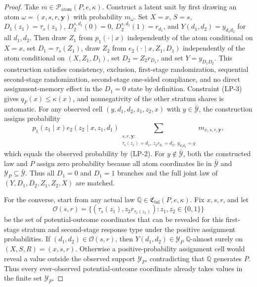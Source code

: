 \documentclass[11pt]{article}
\theoremstyle{definition}
\theoremstyle{plain}
\theoremstyle{remark}
\begin{document}
\begin{proof}
Take \(m\in\mathcal P_{\mathrm{atom}}(P,e,\kappa)\).
Construct a latent unit by first drawing an atom \(\omega=(x,s,r,\mathbf y)\) with probability \(m_\omega\).
Set \(X=x\), \(S=s\), \(D_1(z_1)=\tau_s(z_1)\), \(D_2^{s,d_1}(0)=0\), \(D_2^{s,d_1}(1)=r_{d_1}\), and \(Y(d_1,d_2)=y_{d_1d_2}\) for all \(d_1,d_2\).
Then draw \(Z_1\) from \(p_1(\cdot\mid x)\) independently of the atom conditional on \(X=x\), set \(D_1=\tau_s(Z_1)\), draw \(Z_2\) from \(e_2(\cdot\mid x,Z_1,D_1)\) independently of the atom conditional on \((X,Z_1,D_1)\), set \(D_2=Z_2r_{D_1}\), and set \(Y=y_{D_1D_2}\).
This construction satisfies consistency, exclusion, first-stage randomization, sequential second-stage randomization, second-stage one-sided compliance, and no direct assignment-memory effect in the \(D_1=0\) state by definition.
Constraint (LP-3) gives \(q_F(x)\le\kappa(x)\), and nonnegativity of the other stratum shares is automatic.
For any observed cell \((y,d_1,d_2,z_1,z_2,x)\) with \(y\in\bar{\mathcal Y}\), the construction assigns probability
\[
p_1(z_1\mid x)e_2(z_2\mid x,z_1,d_1)
\sum_{\substack{s,r,\mathbf y:\\
\tau_s(z_1)=d_1,\ z_2r_{d_1}=d_2,\ y_{d_1d_2}=y}}
m_{x,s,r,\mathbf y},
\]
which equals the observed probability by (LP-2).
For \(y\notin\bar{\mathcal Y}\), both the constructed law and \(P\) assign zero probability because all atom coordinates lie in \(\bar{\mathcal Y}\) and \(\mathcal Y_P\subseteq\bar{\mathcal Y}\).
Thus all \(D_1=0\) and \(D_1=1\) branches and the full joint law of \((Y,D_1,D_2,Z_1,Z_2,X)\) are matched.

For the converse, start from any actual law \(\mathbb Q\in\mathfrak C_{\mathrm{bd}}(P,e,\kappa)\).
Fix \(x,s,r\), and let
\[
\mathcal O(s,r)=
\{(\tau_s(z_1),z_2r_{\tau_s(z_1)}): z_1,z_2\in\{0,1\}
\}
\]
be the set of potential-outcome coordinates that can be revealed for this first-stage stratum and second-stage response type under the positive assignment probabilities.
If \((d_1,d_2)\in\mathcal O(s,r)\), then \(Y(d_1,d_2)\in\mathcal Y_P\) \(\mathbb Q\)-almost surely on \((X,S,R)=(x,s,r)\).
Otherwise a positive-probability assignment cell would reveal a value outside the observed support \(\mathcal Y_P\), contradicting that \(\mathbb Q\) generates \(P\).
Thus every ever-observed potential-outcome coordinate already takes values in the finite set \(\mathcal Y_P\).


\end{proof}
\end{document}
